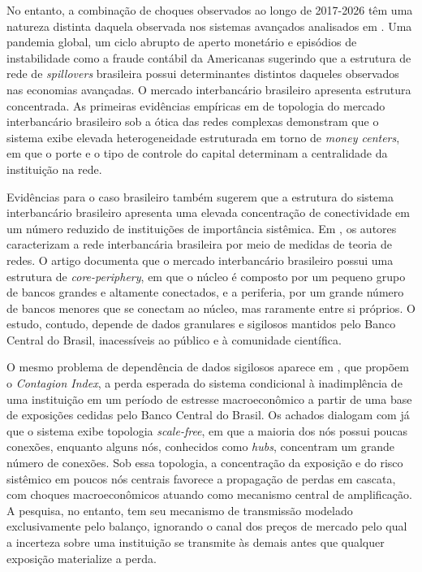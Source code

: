 \documentclass[12pt, a4paper, oneside, english, brazil]{abntex2}
\begin{document}
No entanto, a combinação de choques observados ao longo de 2017-2026 têm uma natureza distinta 
daquela observada nos sistemas avançados 
analisados em \textcite{diebold2016}. Uma pandemia global, um ciclo abrupto de aperto monetário
e episódios de instabilidade como a fraude contábil da Americanas sugerindo que a estrutura de rede de 
\textit{spillovers} brasileira possui determinantes distintos daqueles observados nas
economias avançadas. O mercado interbancário brasileiro
apresenta estrutura concentrada. As primeiras evidências empíricas em \textcite{cajueiro2008} 
de topologia do mercado interbancário brasileiro sob a ótica das redes complexas
demonstram que o sistema exibe elevada heterogeneidade estruturada em torno de
\textit{money centers}, em que o porte e o tipo de controle do capital determinam a
centralidade da instituição na rede.

Evidências para o caso brasileiro também sugerem que a estrutura do sistema interbancário brasileiro
apresenta uma elevada concentração de conectividade em um número reduzido de instituições 
de importância sistêmica. Em \textcite{silva2016}, os autores
caracterizam a rede interbancária brasileira por meio de medidas de teoria de redes. O
artigo documenta que o mercado interbancário brasileiro possui uma estrutura de
\textit{core-periphery}, em que o núcleo é composto por um pequeno grupo de bancos
grandes e altamente conectados, e a periferia, por um grande número de bancos menores
que se conectam ao núcleo, mas raramente entre si próprios. O estudo, contudo, depende
de dados granulares e sigilosos mantidos pelo Banco Central do Brasil, inacessíveis ao
público e à comunidade científica.

O mesmo problema de dependência de dados sigilosos aparece em \textcite{cont2013}, que
propõem o \textit{Contagion Index}, a perda esperada do sistema condicional à inadimplência 
de uma instituição em um período de estresse macroeconômico a partir de uma base de exposições
cedidas pelo Banco Central do Brasil. Os achados dialogam com \textcite{silva2016} já que
o sistema exibe topologia \textit{scale-free}, em que a maioria dos nós possui poucas conexões, 
enquanto alguns nós, conhecidos como \textit{hubs}, concentram um grande número de conexões. 
Sob essa topologia, a concentração da exposição e do risco sistêmico em poucos nós centrais
favorece a propagação de perdas em cascata, com choques macroeconômicos atuando como
mecanismo central de amplificação. A pesquisa, no entanto, tem seu mecanismo de transmissão
modelado exclusivamente pelo balanço, ignorando o canal dos preços de mercado pelo qual a
incerteza sobre uma instituição se transmite às demais antes que qualquer exposição materialize
a perda. 
\end{document}
